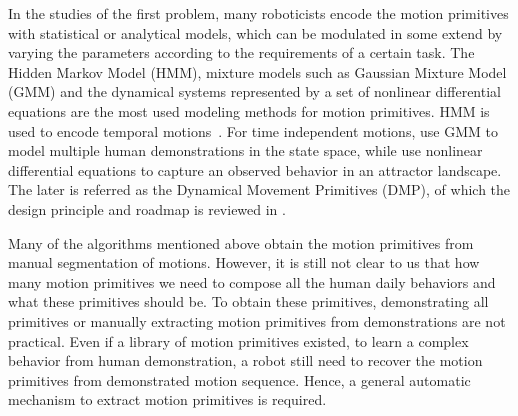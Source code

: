 In the studies of the first problem, many roboticists encode the motion primitives with statistical or analytical models, which can be modulated in some extend by varying the parameters according to the requirements of a certain task. The Hidden Markov Model (HMM), mixture models such as Gaussian Mixture Model (GMM) and the dynamical systems represented by a set of nonlinear differential equations are the most used modeling methods for motion primitives. HMM is used to encode temporal motions~\citep{inamura2004embodied,kulic2008incremental,takano2008integrating,lee2010incremental,bidan2013robio}. For time independent motions, \citet{gribovskaya2010learning,khansari2010imitation} use GMM to model multiple human demonstrations in the state space, while \citet{ijspeert2002movement,Ijspeert2003attractor,schaal2005learning,peters2008reinforcement} use nonlinear differential equations to capture an observed behavior in an attractor landscape. The later is referred as the Dynamical Movement Primitives (DMP), of which the design principle and roadmap is reviewed in \citep{ijspeert2013dynamical}.

Many of the algorithms mentioned above obtain the motion primitives from manual segmentation of motions. However, it is still not clear to us that how many motion primitives we need to compose all the human daily behaviors and what these primitives should be. To obtain these primitives, demonstrating all primitives or manually extracting motion primitives from demonstrations are not practical. Even if a library of motion primitives existed, to learn a complex behavior from human demonstration, a robot still need to recover the motion primitives from demonstrated motion sequence. Hence, a general automatic mechanism to extract motion primitives is required.

